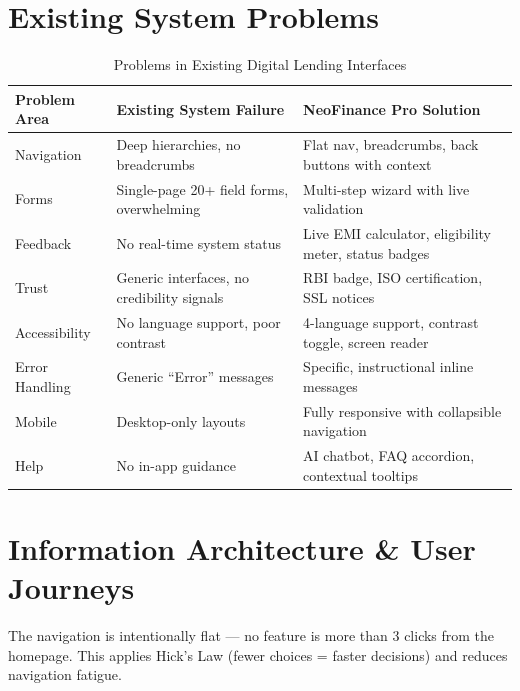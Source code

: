 \documentclass[11pt,a4paper]{article}
\begin{document}
\section{Existing System Problems}

\begin{table}[H]
\caption{Problems in Existing Digital Lending Interfaces}
\centering\small
\begin{tabularx}{\textwidth}{l X X}
\toprule
\textbf{Problem Area} & \textbf{Existing System Failure} & \textbf{NeoFinance Pro Solution} \\
\midrule
\rowcolor{rowalt} Navigation & Deep hierarchies, no breadcrumbs & Flat nav, breadcrumbs, back buttons with context \\
Forms & Single-page 20+ field forms, overwhelming & Multi-step wizard with live validation \\
\rowcolor{rowalt} Feedback & No real-time system status & Live EMI calculator, eligibility meter, status badges \\
Trust & Generic interfaces, no credibility signals & RBI badge, ISO certification, SSL notices \\
\rowcolor{rowalt} Accessibility & No language support, poor contrast & 4-language support, contrast toggle, screen reader \\
Error Handling & Generic ``Error'' messages & Specific, instructional inline messages \\
\rowcolor{rowalt} Mobile & Desktop-only layouts & Fully responsive with collapsible navigation \\
Help & No in-app guidance & AI chatbot, FAQ accordion, contextual tooltips \\
\bottomrule
\end{tabularx}
\end{table}

\section{Information Architecture \& User Journeys}

The navigation is intentionally flat --- no feature is more than 3 clicks from the homepage. This applies Hick's Law (fewer choices = faster decisions) and reduces navigation fatigue.
\end{document}
